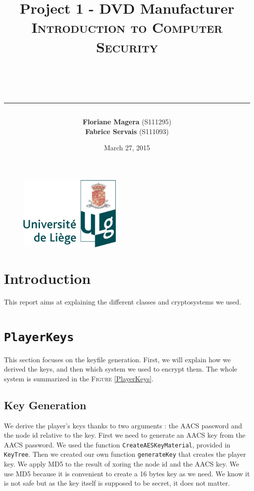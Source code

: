 \documentclass[a4paper,titlepage]{article}
\begin{document}
\begin{titlepage}

\begin{figure}
\centering
\includegraphics[width=5cm]{logo-ulg.png}
\end{figure}



\title{
\vspace{0.2cm}
\LARGE{\textbf{Project 1 - DVD Manufacturer}} \\ \textsc{Introduction to Computer Security}
\author{\textbf{Floriane Magera} \small{(S111295})\\\textbf{Fabrice Servais} \small{(S111093})}\\
\date{March 27, 2015}
\rule{15cm}{1.5pt}
}

\end{titlepage}

\pagestyle{fancy}

\maketitle


\section{Introduction}
This report aims at explaining the different classes and cryptosystems we used.

\section{\texttt{PlayerKeys}}
This section focuses on the keyfile generation. First, we will explain how we derived the keys, and then which system we used to encrypt them. The whole system is summarized in the \textsc{Figure} \ref{PlayerKeys}.

	\subsection{Key Generation}
	We derive the player's keys thanks to two arguments : the AACS password and the node id relative to the key. First we need to generate an AACS key from the AACS password. We used the function \texttt{CreateAESKeyMaterial}, provided in \texttt{KeyTree}. Then we created our own function 		\texttt{generateKey} that creates the player key. We apply MD5 to the result of xoring the node id and the AACS key. We use MD5 because it is convenient to create a 16 bytes key as we need. We know it is not safe but as the key itself is supposed to be secret, it does not matter. 
	
\end{document}
